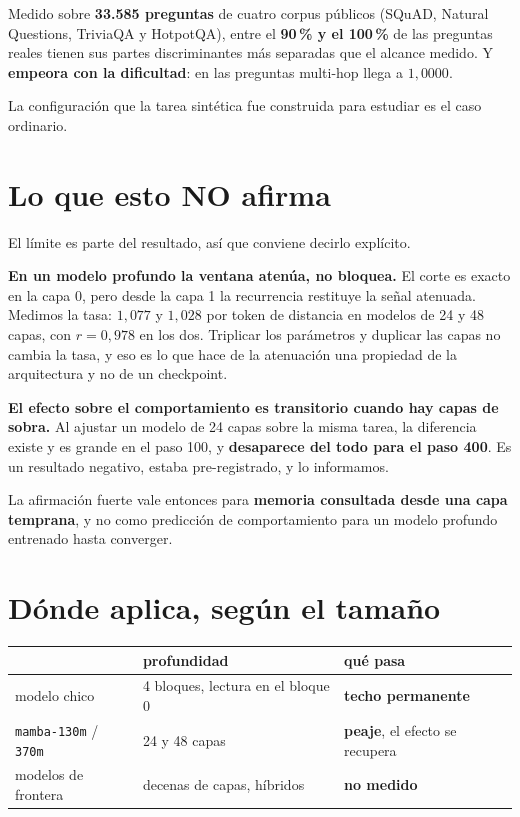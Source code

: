 \documentclass[11pt,a4paper]{article}
\begin{document}
Medido sobre \textbf{33.585 preguntas} de cuatro corpus públicos (SQuAD, Natural Questions, TriviaQA y
HotpotQA), entre el \textbf{90\,\% y el 100\,\%} de las preguntas reales tienen sus partes
discriminantes más separadas que el alcance medido. Y \textbf{empeora con la dificultad}: en las
preguntas multi-hop llega a $1{,}0000$.

La configuración que la tarea sintética fue construida para estudiar es el caso ordinario.

\section{Lo que esto NO afirma}

El límite es parte del resultado, así que conviene decirlo explícito.

\textbf{En un modelo profundo la ventana atenúa, no bloquea.} El corte es exacto en la capa 0, pero
desde la capa 1 la recurrencia restituye la señal atenuada. Medimos la tasa: $1{,}077$ y $1{,}028$ por
token de distancia en modelos de 24 y 48 capas, con $r = 0{,}978$ en los dos. Triplicar los parámetros
y duplicar las capas no cambia la tasa, y eso es lo que hace de la atenuación una propiedad de la
arquitectura y no de un checkpoint.

\textbf{El efecto sobre el comportamiento es transitorio cuando hay capas de sobra.} Al ajustar un
modelo de 24 capas sobre la misma tarea, la diferencia existe y es grande en el paso 100, y
\textbf{desaparece del todo para el paso 400}. Es un resultado negativo, estaba pre-registrado, y lo
informamos.

\begin{center}
\end{center}

La afirmación fuerte vale entonces para \textbf{memoria consultada desde una capa temprana}, y no como
predicción de comportamiento para un modelo profundo entrenado hasta converger.

\section{Dónde aplica, según el tamaño}

\begin{center}
\begin{tabular}{lll}
\toprule
 & profundidad & qué pasa \\
\midrule
modelo chico & 4 bloques, lectura en el bloque 0 & \textbf{techo permanente} \\
\texttt{mamba-130m} / \texttt{370m} & 24 y 48 capas & \textbf{peaje}, el efecto se recupera \\
modelos de frontera & decenas de capas, híbridos & \textbf{no medido} \\
\bottomrule
\end{tabular}
\end{center}
\end{document}
